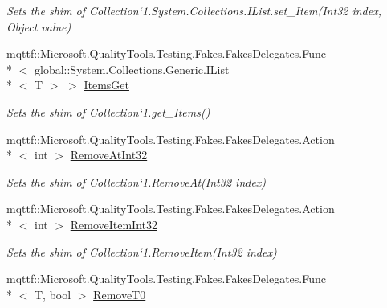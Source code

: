 \begin{DoxyCompactItemize}
\begin{DoxyCompactList}\small\item\em Sets the shim of Collection`1.System.\-Collections.\-I\-List.\-set\-\_\-\-Item(\-Int32 index, Object value)\end{DoxyCompactList}\item 
mqttf\-::\-Microsoft.\-Quality\-Tools.\-Testing.\-Fakes.\-Fakes\-Delegates.\-Func\\*
$<$ global\-::\-System.\-Collections.\-Generic.\-I\-List\\*
$<$ T $>$ $>$ \hyperlink{class_system_1_1_collections_1_1_object_model_1_1_fakes_1_1_shim_collection_3_01_t_01_4_ab467dff7f2ae47a7e3885390eb05b889}{Items\-Get}
\begin{DoxyCompactList}\small\item\em Sets the shim of Collection`1.get\-\_\-\-Items()\end{DoxyCompactList}\item 
mqttf\-::\-Microsoft.\-Quality\-Tools.\-Testing.\-Fakes.\-Fakes\-Delegates.\-Action\\*
$<$ int $>$ \hyperlink{class_system_1_1_collections_1_1_object_model_1_1_fakes_1_1_shim_collection_3_01_t_01_4_a9dd09b8943ad528b18131c8c9b4e5233}{Remove\-At\-Int32}
\begin{DoxyCompactList}\small\item\em Sets the shim of Collection`1.Remove\-At(\-Int32 index)\end{DoxyCompactList}\item 
mqttf\-::\-Microsoft.\-Quality\-Tools.\-Testing.\-Fakes.\-Fakes\-Delegates.\-Action\\*
$<$ int $>$ \hyperlink{class_system_1_1_collections_1_1_object_model_1_1_fakes_1_1_shim_collection_3_01_t_01_4_a400eb171d8deaf9d1f1ec61c344d14de}{Remove\-Item\-Int32}
\begin{DoxyCompactList}\small\item\em Sets the shim of Collection`1.Remove\-Item(\-Int32 index)\end{DoxyCompactList}\item 
mqttf\-::\-Microsoft.\-Quality\-Tools.\-Testing.\-Fakes.\-Fakes\-Delegates.\-Func\\*
$<$ T, bool $>$ \hyperlink{class_system_1_1_collections_1_1_object_model_1_1_fakes_1_1_shim_collection_3_01_t_01_4_a0bfaa96e736cfccfc660eec0d5af3574}{Remove\-T0}

\end{DoxyCompactItemize}
